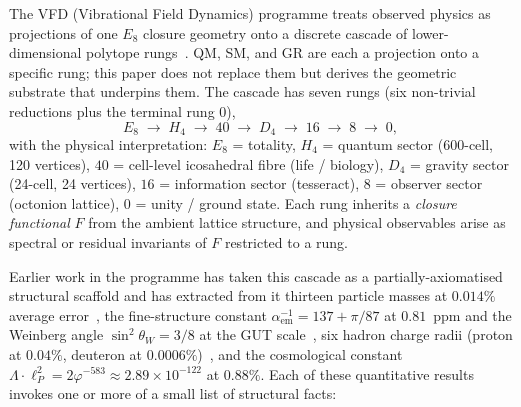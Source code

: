 \documentclass[12pt]{article}
\theoremstyle{definition}
\theoremstyle{remark}
\begin{document}
The VFD (Vibrational Field Dynamics) programme treats observed physics as projections of one $E_8$ closure geometry onto a discrete cascade of lower-dimensional polytope rungs~\citep{SmartXXXV}. QM, SM, and GR are each a projection onto a specific rung; this paper does not replace them but derives the geometric substrate that underpins them. The cascade has seven rungs (six non-trivial reductions plus the terminal rung $0$),
\begin{equation}\label{eq:cascade}
E_8 \;\longrightarrow\; H_4 \;\longrightarrow\; 40 \;\longrightarrow\; D_4 \;\longrightarrow\; 16 \;\longrightarrow\; 8 \;\longrightarrow\; 0,
\end{equation}
with the physical interpretation: $E_8$ = totality, $H_4$ = quantum sector (600-cell, 120 vertices), $40$ = cell-level icosahedral fibre (life / biology), $D_4$ = gravity sector (24-cell, 24 vertices), $16$ = information sector (tesseract), $8$ = observer sector (octonion lattice), $0$ = unity / ground state. Each rung inherits a \emph{closure functional} $F$ from the ambient lattice structure, and physical observables arise as spectral or residual invariants of $F$ restricted to a rung.

Earlier work in the programme has taken this cascade as a partially-axiomatised structural scaffold and has extracted from it thirteen particle masses at $0.014\%$ average error~\citep{SmartV}, the fine-structure constant $\alpha_{\mathrm{em}}^{-1} = 137 + \pi/87$ at $0.81$~ppm and the Weinberg angle $\sin^2\theta_W = 3/8$ at the GUT scale~\citep{SmartXXII}, six hadron charge radii (proton at $0.04\%$, deuteron at $0.0006\%$)~\citep{SmartXXXII}, and the cosmological constant $\Lambda \cdot \ell_P^2 = 2\varphi^{-583} \approx 2.89 \times 10^{-122}$ at $0.88\%$. Each of these quantitative results invokes one or more of a small list of structural facts:
\end{document}
